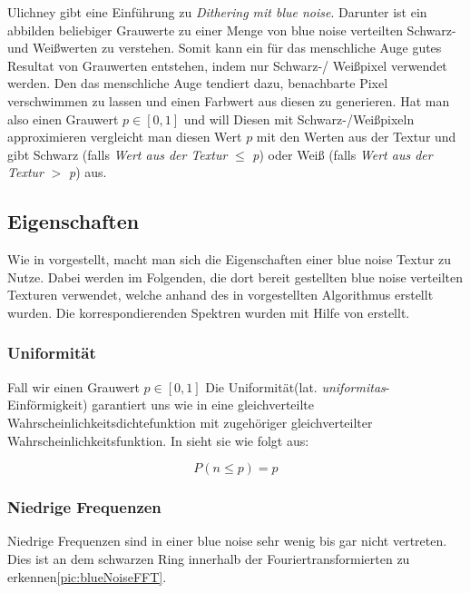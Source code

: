 
\cite{3288}Ulichney gibt eine Einführung zu \textit{Dithering mit blue noise}. Darunter ist ein abbilden
beliebiger Grauwerte zu einer Menge von blue noise verteilten Schwarz- und Weißwerten zu verstehen.
Somit kann ein für das menschliche Auge gutes Resultat von Grauwerten entstehen, indem nur Schwarz-/
Weißpixel verwendet werden. Den das menschliche Auge tendiert dazu, benachbarte Pixel verschwimmen
zu lassen und einen Farbwert aus diesen zu generieren. Hat man also einen Grauwert $\textit{p} \in [0,1]$
und will Diesen mit Schwarz-/Weißpixeln approximieren vergleicht man diesen Wert $\textit{p}$ mit den 
Werten aus der Textur und gibt Schwarz (falls \textit{Wert aus der Textur} $\leq$ \textit{p}) oder 
Weiß (falls \textit{Wert aus der Textur} $>$ \textit{p}) aus.


\subsection{Eigenschaften}

Wie in \cite{Pet17} vorgestellt, macht man sich die Eigenschaften einer
blue noise Textur zu Nutze. Dabei werden im Folgenden, die dort bereit 
gestellten blue noise verteilten Texturen verwendet, welche anhand des in
\cite{ulichney1993void} vorgestellten Algorithmus erstellt wurden.
Die korrespondierenden Spektren wurden mit Hilfe von \cite{FFTProgWeb} erstellt.

\subsubsection{Uniformität}
Fall wir einen Grauwert $\textit{p} \in [0,1]$
Die Uniformität(lat. \textit{uniformitas}-Einförmigkeit) garantiert uns 
wie in \cite{3288} eine gleichverteilte Wahrscheinlichkeitsdichtefunktion
mit zugehöriger gleichverteilter Wahrscheinlichkeitsfunktion. In \cite{Pet17}
sieht sie wie folgt aus: 

\begin{equation}\label{eq:uniformität}
    P(n \leq p) = p
\end{equation}

\cite{kiencke2009signale}

\subsubsection{Niedrige Frequenzen}
Niedrige Frequenzen sind in einer blue noise sehr wenig bis gar nicht 
vertreten. Dies ist an dem schwarzen Ring innerhalb der Fouriertransformierten
zu erkennen\ref{pic:blueNoiseFFT}.

